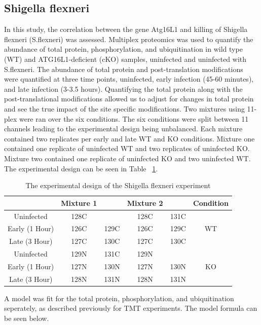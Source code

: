 \documentclass{mcp}
\begin{document}
\subsection{Shigella flexneri}

In this study, the correlation between the gene Atg16L1 and killing of Shigella flexneri (S.flexneri) was assessed. Multiplex proteomics was used to quantify the abundance of total protein, phosphorylation, and ubiquitination in wild type (WT) and ATG16L1-deficient (cKO) samples, uninfected and uninfected with S.flexneri. The abundance of total protein and post-translation modifications were quantified at three time points, uninfected, early infection (45-60 minutes), and late infection (3-3.5 hours). Quantifying the total protein along with the post-translational modifications allowed us to adjust for changes in total protein and see the true impact of the site specific modifications. Two mixtures using 11-plex were ran over the six conditions. The six conditions were split between 11 channels leading to the experimental design being unbalanced. Each mixture contained two replicates per early and late WT and KO conditions. Mixture one contained one replicate of uninfected WT and two replicates of uninfected KO. Mixture two contained one replicate of uninfected KO and two uninfected WT. The experimental design can be seen in Table ~\ref{table:shigella_design}.

\begin{table}[h!]
\centering
\begin{tabular}{|c | c c | c c | c|}
\hline
 & Mixture 1 & & Mixture 2 & & Condition \\ [0.5ex]
 \hline\hline
 Uninfected & 128C & & 128C & 131C & \\
 \hline
Early (1 Hour) & 126C & 129C & 126C & 129C & WT \\
\hline
Late (3 Hour) & 127C & 130C & 127C & 130C & \\
\hline
Uninfected & 129N & 131C & 129N & & \\
\hline
Early (1 Hour) & 127N & 130N & 127N & 130N & KO \\
\hline
Late (3 Hour) & 128N & 131N & 128N & 131N & \\
\hline

\end{tabular}
\caption{The experimental design of the Shigella flexneri experiment}
\label{table:shigella_design}
\end{table}

A model was fit for the total protein, phosphorylation, and ubiquitination seperately, as described previously for TMT experiments. The model formula can be seen below.
\end{document}
